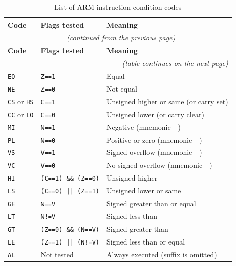 \documentclass[english, ing, kiv, he, iso690numb, pdf]{fasthesis}
\begin{document}
	\newpage
	
	\begin{center}
		\begin{longtable}{p{}p{}p{}}
			\caption{List of ARM instruction condition codes}
			\label{List of ARM instruction condition codes}\\
			\toprule[1.5pt]
			\textbf{Code} & \textbf{Flags tested} & \textbf{Meaning}\\
			\midrule
			\endfirsthead
			\multicolumn{3}{c}{\tablename{}~\thetable{} \textit{(continued from the previous page)}}\\
			\midrule
			\textbf{Code} & \textbf{Flags tested} & \textbf{Meaning}\\
			\midrule
			\endhead
			\midrule
			\multicolumn{3}{r}{\textit{(table continues on the next page)}}\\
			\endfoot
			\bottomrule[1.5pt]
			\endlastfoot
			\texttt{EQ} & \texttt{Z==1} & Equal\\
			\texttt{NE} & \texttt{Z==0} & Not equal\\
			\texttt{CS} or \texttt{HS} & \texttt{C==1} & Unsigned higher or same (or carry set)\\
			\texttt{CC} or \texttt{LO} & \texttt{C==0} & Unsigned lower (or carry clear)\\
			\texttt{MI} & \texttt{N==1} & Negative (mnemonic - \say{minus})\\
			\texttt{PL} & \texttt{N==0} & Positive or zero (mnemonic - \say{plus})\\
			\texttt{VS} & \texttt{V==1} & Signed overflow (mnemonic - \say{\texttt{V} set})\\
			\texttt{VC} & \texttt{V==0} & No signed overflow (mnemonic - \say{\texttt{V} clear})\\
			\texttt{HI} & \texttt{(C==1) \&\& (Z==0)} & Unsigned higher\\
			\texttt{LS} & \texttt{(C==0) || (Z==1)} & Unsigned lower or same\\
			\texttt{GE} & \texttt{N==V} & Signed greater than or equal\\
			\texttt{LT} & \texttt{N!=V} & Signed less than\\
			\texttt{GT} & \texttt{(Z==0) \&\& (N==V)} & Signed greater than\\
			\texttt{LE} & \texttt{(Z==1) || (N!=V)} & Signed less than or equal\\
			\texttt{AL} & Not tested & Always executed (suffix is omitted)\\
		\end{longtable}
	\end{center}
	
\end{document}
